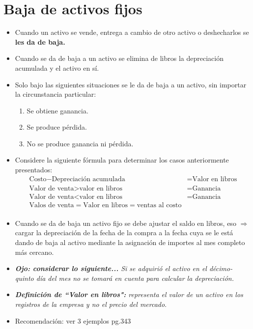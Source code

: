 \documentclass{article}
\begin{document}
\section{Baja de activos fijos}
\begin{itemize}
    \item Cuando un activo se vende, entrega a cambio de otro activo o deshecharlos se \textbf{les da de baja.}
    \item Cuando se da de baja a un activo se elimina de libros la depreciación acumulada y el activo en sí.
    \item Solo bajo las siguientes situaciones se le da de baja a un activo, sin importar la circunstancia particular:
        \begin{enumerate}
            \item Se obtiene ganancia.
            \item Se produce pérdida.
            \item No se produce ganancia ni pérdida.
        \end{enumerate}
    
    \item Considere la siguiente fórmula para determinar los casos anteriormente presentados:
        \begin{align*}
            \text{Costo} - \text{Depreciación acumulada} & = \text{Valor en libros} \\ 
            \text{Valor de venta} > \text{valor en libros} & =  \text{Ganancia} \\ 
            \text{Valor de venta} < \text{valor en libros} & =  \text{Ganancia} \\             
            \text{Valos de venta} = \text{Valor en libros} = \text{ventas al costo} \\ 
        \end{align*}
    
    \item Cuando se da de baja un activo fijo se debe ajustar el saldo en libros, eso $\Rightarrow$ cargar la depreciación de la fecha de la compra a la fecha cuya se le está dando de baja al activo mediante la asignación de importes al mes completo más cercano.
    \item \emph{\textbf{Ojo: considerar lo siguiente...} Si se adquirió el activo en el décimo-quinto día del mes no se tomará en cuenta para calcular la depreciación. }
    
    \item \emph{\textbf{Definición de ``Valor en libros":} representa el valor de un activo en los registros de la empresa y no el precio del mercado}.
    \item Recomendación: ver 3 ejemplos pg.343
\end{itemize}
\end{document}
